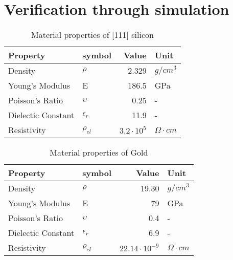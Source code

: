 \section{Verification through simulation}
\label{sec:verification}

\begin{table}
	\centering
	\begin{tabular}{ l l r l } 
		\toprule
		Property & symbol & Value & Unit \\
		\midrule
		Density & $\rho$ & 2.329 & $g/cm^3$ \\
		Young's Modulus & E & 186.5 & GPa \\ 
		Poisson's Ratio & $\upsilon$ & 0.25 & - \\ 
		Dielectic Constant & $\epsilon_r$ & 11.9 & - \\
		Resistivity & $\rho_{el}$ & $3.2\cdot10^5 $ & $\Omega \cdot cm$ \\
		\bottomrule
	\end{tabular}
	\caption{Material properties of [111] silicon}
	\label{tab:silicium_mat}
\end{table}

\begin{table}
	\centering
	\begin{tabular}{ l l r l } 
		\toprule
		Property & symbol & Value & Unit \\
		\midrule
		Density & $\rho$ & 19.30 & $g/cm^3$ \\
		Young's Modulus & E & 79 & GPa \\ 
		Poisson's Ratio & $\upsilon$ & 0.4 & - \\ 
		Dielectic Constant & $\epsilon_r$ & 6.9 & - \\
		Resistivity & $\rho_{el}$ & $22.14\cdot10^{-9} $ & $\Omega \cdot cm$ \\
		\bottomrule
	\end{tabular}
	\caption{Material properties of Gold}
	\label{tab:silicium_mat}
\end{table}
